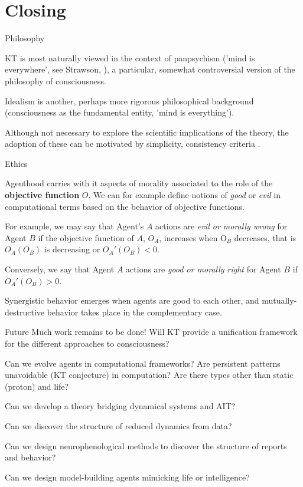\section{Closing}




\begin{frame}[label=ladila]{Philosophy}

KT is most naturally viewed in the context of panpsychism ('mind is everywhere', see Strawson, \cite{Goff:2019aa}), a particular, somewhat controversial version of the philosophy of consciousness.  \vfill

Idealism is another, perhaps more rigorous philosophical background (consciousness as the fundamental entity, 'mind is everything'). \vfill

 Although not necessary to explore the scientific implications of the theory, the adoption of these can be  motivated by simplicity, consistency criteria \citep{Symes2022-ri}.
 
\end{frame}




\begin{frame}[label=ladila]{Ethics}

 Agenthood carries with it aspects of morality associated to the role of the {\bf objective function} $O$. We can for example define notions of {\em good} or {\em evil} in computational terms based on the behavior of objective functions. \vfill
 
 For example, we may say that Agent's $A$ actions are {\em evil or morally wrong} for Agent $B$ if the objective function of $A$, $O_A$, increases when O$_B$ decreases, that is $O_A(O_B)$ is decreasing or  $O_A'(O_B) <0$.
 \vfill
 
 Conversely, we say that Agent $A$ actions are {\em good or morally right} for Agent $B$ if $O_A'(O_B) >0$. \vfill 

Synergistic behavior emerges when agents are good to each other, and mutually-destructive behavior takes place in the complementary case.  
 
\end{frame}

\begin{frame}[label=ladila]{Future}
Much work remains to be done! Will KT provide a unification framework for the different approaches to consciousness?\vfill

Can we evolve agents in computational frameworks? Are persistent patterns unavoidable (KT conjecture) in computation? Are there  types other than static (proton) and life? \vfill

Can we develop a theory bridging dynamical systems and AIT? \vfill

Can we discover the structure of reduced dynamics from data? \vfill

Can we design neurophenological methods to discover the structure of reports and behavior? \vfill

Can we design model-building agents mimicking life or intelligence? \vfill


\end{frame}


